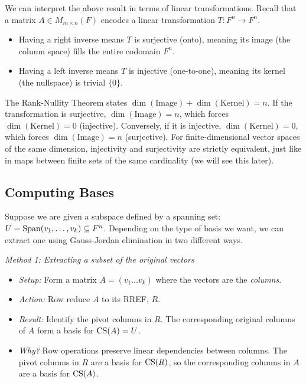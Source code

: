 \documentclass[../linear_algebra_and_groups.tex]{subfiles}
\begin{document}
\begin{remark}
    We can interpret the above result in terms of linear transformations. Recall that a matrix $A\in M_{m\times n}(F)$ encodes a linear transformation $T: F^n \to F^n$. 
    \begin{itemize}
        \item Having a right inverse means $T$ is surjective (onto), meaning its image (the column space) fills the entire codomain $F^n$. 
        \item Having a left inverse means $T$ is injective (one-to-one), meaning its kernel (the nullspace) is trivial $\{0\}$.
    \end{itemize}
    The Rank-Nullity Theorem states $\dim(\text{Image}) + \dim(\text{Kernel}) = n$. If the transformation is surjective, $\dim(\text{Image}) = n$, which forces $\dim(\text{Kernel}) = 0$ (injective). Conversely, if it is injective, $\dim(\text{Kernel}) = 0$, which forces $\dim(\text{Image}) = n$ (surjective). For finite-dimensional vector spaces of the same dimension, injectivity and surjectivity are strictly equivalent, just like in maps between finite sets of the same cardinality (we will see this later).
\end{remark}

\subsection{Computing Bases}

Suppose we are given a subspace defined by a spanning set: $U = \operatorname{Span}(v_1, \dots, v_k) \subseteq F^n$. Depending on the type of basis we want, we can extract one using Gauss-Jordan elimination in two different ways.

\textit{Method 1: Extracting a subset of the original vectors}
\begin{itemize}
    \item \textit{Setup:} Form a matrix $A = (v_1 \dots v_k)$ where the vectors are the \textit{columns}.
    \item \textit{Action:} Row reduce $A$ to its RREF, $R$. 
    \item \textit{Result:} Identify the pivot columns in $R$. The corresponding original columns of $A$ form a basis for $\operatorname{CS}(A) = U$. 
    \item \textit{Why?} Row operations preserve linear dependencies between columns. The pivot columns in $R$ are a basis for $\operatorname{CS}(R)$, so the corresponding columns in $A$ are a basis for $\operatorname{CS}(A)$.
\end{itemize}
\end{document}
